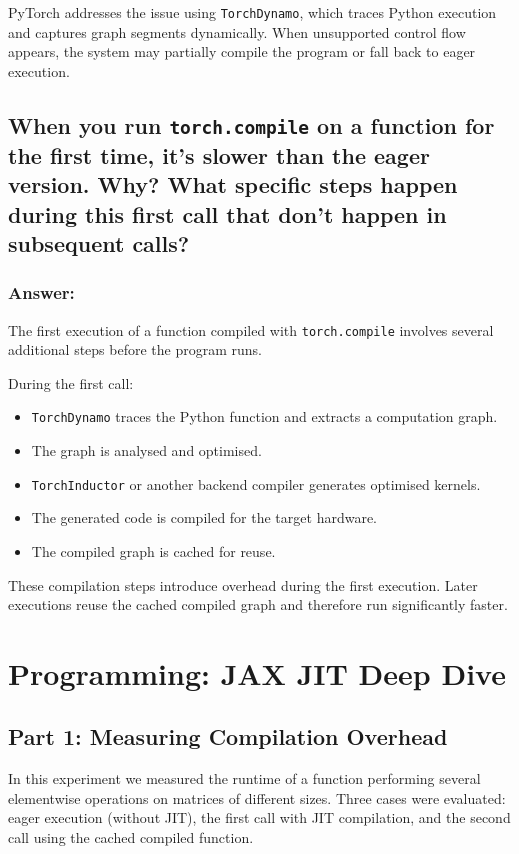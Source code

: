 \documentclass{article}
\begin{document}
PyTorch addresses the issue using \texttt{TorchDynamo}, which traces Python execution and captures graph segments dynamically. When unsupported control flow appears, the system may partially compile the program or fall back to eager execution.

\subsection{When you run \texttt{torch.compile} on a function for the first time,
it’s slower than the eager version. Why? What specific steps happen
during this first call that don’t happen in subsequent calls?}

\subsubsection*{Answer:}

The first execution of a function compiled with \texttt{torch.compile} involves several additional steps before the program runs.

During the first call:

\begin{itemize}
\item \texttt{TorchDynamo} traces the Python function and extracts a computation graph.
\item The graph is analysed and optimised.
\item \texttt{TorchInductor} or another backend compiler generates optimised kernels.
\item The generated code is compiled for the target hardware.
\item The compiled graph is cached for reuse.
\end{itemize}

These compilation steps introduce overhead during the first execution. Later executions reuse the cached compiled graph and therefore run significantly faster.

\section{Programming: JAX JIT Deep Dive}

\subsection{Part 1: Measuring Compilation Overhead}

In this experiment we measured the runtime of a function performing several elementwise operations on matrices of different sizes. Three cases were evaluated: eager execution (without JIT), the first call with JIT compilation, and the second call using the cached compiled function.
\end{document}
